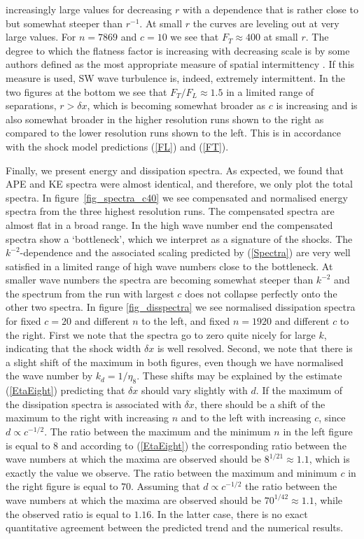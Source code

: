 increasingly large values for decreasing $ r $ with a dependence that is rather
close to but somewhat steeper than $ r^{-1} $. At small $ r $ the curves are
leveling out at very large values. For $ n = 7869 $ and $ c = 10 $ we see that
$ F_{T} \approx 400 $ at small $ r $. The degree to which the flatness factor
is increasing with decreasing scale is by some authors defined as the most
appropriate measure of spatial intermittency \cite[see for example][]{Frisch}.
If this measure is used, SW wave turbulence is, indeed, extremely intermittent.
In the two figures at the bottom we see that $ F_{T}/F_{L} \approx 1.5 $ in a
limited range of separations, $ r > \delta x $, which is becoming somewhat
broader as $ c $ is increasing and is also somewhat broader in the higher
resolution runs shown to the right as compared to the lower resolution runs
shown to the left. This is in accordance with the shock model predictions
(\ref{FL}) and (\ref{FT}).

Finally, we present energy and dissipation spectra. As expected, we found that APE and KE
spectra were almost identical, and therefore, we only plot the
total spectra. In figure~\ref{fig_spectra_c40} we see  compensated and
normalised energy spectra from the three highest resolution runs. The
compensated spectra are almost flat in a broad range. In the high wave number
end the compensated spectra show a `bottleneck', which we interpret as a
signature of the shocks. The $ k^{-2} $-dependence and the associated scaling predicted
by (\ref{Spectra}) are very well satisfied in a limited range of high wave
numbers close to the bottleneck. At smaller wave numbers the spectra are
becoming somewhat steeper than $ k^{-2} $ and the spectrum from the run with
largest $ c $ does not collapse perfectly onto the other two spectra.  In figure \ref{fig_disspectra}
 we see normalised dissipation spectra for fixed $ c= 20 $ and different $ n $ to the left, and fixed $ n = 1920 $
and different $ c $ to the right. First we note that the spectra go to zero quite nicely for large $ k $, indicating that the shock width $ \delta x $ is well resolved. Second, we note that there is a slight shift of the maximum in both figures, even though we have normalised the wave number by $ k_d = 1/\eta_8 $.   These shifts may be explained by the estimate (\ref{EtaEight}) predicting that $ \delta x $ should vary slightly with $ d $. If the maximum of the dissipation spectra is associated with $ \delta x $, there should be a shift of the maximum  to the right with increasing $ n $ and to the left with increasing $ c $, since $ d \propto c^{-1/2} $.
 The ratio between the maximum and the minimum $ n $ in the left figure is equal to 8 and  according to (\ref{EtaEight}) the corresponding ratio between the wave numbers at which the maxima are observed should be $ 8^{1/21} \approx 1.1 $, which is exactly the value we observe. The ratio between the maximum and minimum $ c $ in the right figure is equal to $ 70 $. Assuming that $ d \propto c^{-1/2} $ the ratio between the wave numbers at which the maxima are observed should be $ 70^{1/42} \approx 1.1 $, while the observed ratio is equal to $ 1.16 $. In the latter case, there is no exact quantitative agreement between the predicted trend and the numerical results.




